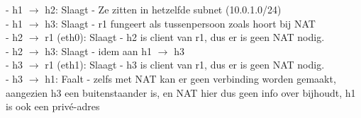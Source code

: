 - h1 $\rightarrow$ h2: Slaagt - Ze zitten in hetzelfde subnet (10.0.1.0/24)\\
- h1 $\rightarrow$ h3: Slaagt - r1 fungeert als tussenpersoon zoals hoort bij NAT\\

- h2 $\rightarrow$ r1 (eth0): Slaagt - h2 is client van r1, dus er is geen NAT nodig.\\
- h2 $\rightarrow$ h3: Slaagt - idem aan h1 $\rightarrow$ h3\\

- h3 $\rightarrow$ r1 (eth1): Slaagt - h3 is client van r1, dus er is geen NAT nodig.\\
- h3 $\rightarrow$ h1: Faalt - zelfs met NAT kan er geen verbinding worden gemaakt, aangezien h3 een buitenstaander is, en NAT hier dus geen info over bijhoudt, h1 is ook een privé-adres